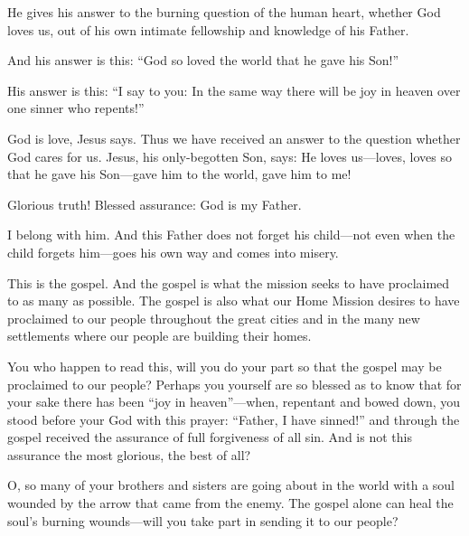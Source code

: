 He gives his answer to the burning question of the human heart, whether God loves us, out of his own intimate fellowship and knowledge of his Father.

And his answer is this: “God so loved the world that he gave his Son!”

His answer is this: “I say to you: In the same way there will be joy in heaven over one sinner who repents!”

God is love, Jesus says. Thus we have received an answer to the question whether God cares for us. Jesus, his only-begotten Son, says: He loves us—loves, loves so that he gave his Son—gave him to the world, gave him to me!

Glorious truth! Blessed assurance: God is my Father.

I belong with him. And this Father does not forget his child—not even when the child forgets him—goes his own way and comes into misery.

This is the gospel. And the gospel is what the mission seeks to have proclaimed to as many as possible. The gospel is also what our Home Mission desires to have proclaimed to our people throughout the great cities and in the many new settlements where our people are building their homes.

You who happen to read this, will you do your part so that the gospel may be proclaimed to our people? Perhaps you yourself are so blessed as to know that for your sake there has been “joy in heaven”—when, repentant and bowed down, you stood before your God with this prayer: “Father, I have sinned!” and through the gospel received the assurance of full forgiveness of all sin. And is not this assurance the most glorious, the best of all?

O, so many of your brothers and sisters are going about in the world with a soul wounded by the arrow that came from the enemy. The gospel alone can heal the soul’s burning wounds—will you take part in sending it to our people?

